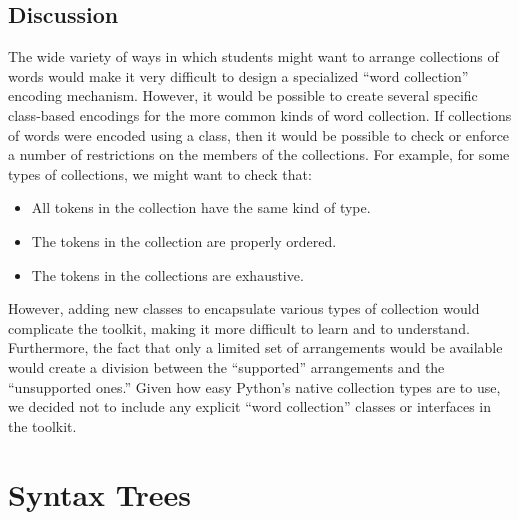 \documentclass[11pt]{article}
\begin{document}

  \subsection{Discussion}

  The wide variety of ways in which students might want to arrange
  collections of words would make it very difficult to design a
  specialized ``word collection'' encoding mechanism.  However, it
  would be possible to create several specific class-based encodings
  for the more common kinds of word collection.  If collections of
  words were encoded using a class, then it would be possible to check
  or enforce a number of restrictions on the members of the
  collections.  For example, for some types of collections, we might
  want to check that:

  \begin{itemize}

    \item All tokens in the collection have the same kind of type.

    \item The tokens in the collection are properly ordered.

    \item The tokens in the collections are exhaustive.

  \end{itemize}

  However, adding new classes to encapsulate various types of
  collection would complicate the toolkit, making it more difficult to
  learn and to understand.  Furthermore, the fact that only a limited
  set of arrangements would be available would create a division
  between the ``supported'' arrangements and the ``unsupported ones.''
  Given how easy Python's native collection types are to use, we
  decided not to include any explicit ``word collection'' classes or
  interfaces in the toolkit.

\section{Syntax Trees}
\label{sec:trees}
\end{document}
